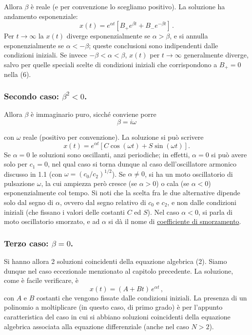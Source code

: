 \documentclass[11pt, a4paper]{book}
\numberwithin{equation}{section}
\begin{document}
Allora $\beta$ è reale (e per convenzione lo scegliamo positivo). La soluzione ha andamento esponenziale:
\begin{equation}
    x(t) = e^{\alpha t} \left[ B_+ e^{\beta t} + B_- e^{-\beta t} \right] \,.
\end{equation}
Per $t \to \infty$ la $x(t)$ diverge esponenzialmente se $\alpha > \beta$, e si annulla esponenzialmente se $\alpha < -\beta$; queste conclusioni sono indipendenti dalle condizioni iniziali. Se invece $-\beta < \alpha < \beta$, $x(t)$ per $t \to \infty$ generalmente diverge, salvo per quelle speciali scelte di condizioni iniziali che corrispondono a $B_+ = 0$ nella (6).

\subsubsection*{Secondo caso: $\beta^2 < 0$.}

Allora $\beta$ è immaginario puro, sicché conviene porre
\begin{equation}
    \beta = i\omega
\end{equation}


con $\omega$ reale (positivo per convenzione). La soluzione si può scrivere
\begin{equation}
    x(t) = e^{\alpha t} \left[ C \cos(\omega t) + S \sin(\omega t) \right] .
\end{equation}
Se $\alpha = 0$ le soluzioni sono oscillanti, anzi periodiche; in effetti,
$\alpha = 0$ si può avere solo per $c_1 = 0$, nel qual caso si torna dunque
al caso dell'oscillatore armonico discusso in 1.1 (con $\omega = (c_0/c_2)^{1/2}$).
Se $\alpha \neq 0$, si ha un moto oscillatorio di pulsazione $\omega$, la cui ampiezza
però cresce (se $\alpha > 0$) o cala (se $\alpha < 0$) esponenzialmente col
tempo. Si noti che la scelta fra le due alternative dipende solo dal segno di
$\alpha$, ovvero dal segno relativo di $c_0$ e $c_2$, e non dalle condizioni iniziali
(che fissano i valori delle costanti $C$ ed $S$). Nel caso $\alpha < 0$, si parla
di moto oscillatorio smorzato, e ad $\alpha$ si dà il nome di \underline{coefficiente di smorzamento}.

\subsubsection*{Terzo caso: $\beta = 0$.}

Si hanno allora 2 soluzioni coincidenti della equazione algebrica (2). Siamo
dunque nel caso eccezionale menzionato al capitolo precedente. La soluzione,
come è facile verificare, è
\begin{equation}
    x(t) = (A + B t) \, e^{\alpha t} \,,
\end{equation}
con $A$ e $B$ costanti che vengono fissate dalle condizioni iniziali. La presenza
di un polinomio a moltiplicare (in questo caso, di primo grado) è per l'appunto
caratteristica del caso in cui si abbiano soluzioni coincidenti della equazione
algebrica associata alla equazione differenziale (anche nel caso $N > 2$).
\end{document}
